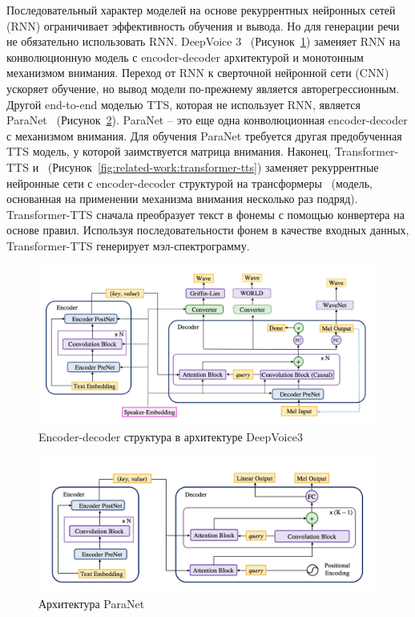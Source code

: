 Последовательный характер моделей на основе рекуррентных нейронных сетей (RNN) ограничивает эффективность обучения и вывода. Но для генерации речи не обязательно использовать RNN. DeepVoice 3~\cite{deepvoice3} (Рисунок~\ref{fig:related-work:deepvoice-3}) заменяет RNN на конволюционную модель с encoder-decoder архитектурой и монотонным механизмом внимания. Переход от RNN к сверточной нейронной сети (CNN) ускоряет обучение, но вывод модели по-прежнему является авторегрессионным. Другой end-to-end моделью TTS, которая не использует RNN, является ParaNet~\cite{paranet} (Рисунок~\ref{fig:related-work:paranet}). ParaNet -- это еще одна конволюционная encoder-decoder с механизмом внимания. Для обучения ParaNet требуется другая предобученная TTS модель, у которой заимствуется матрица внимания. Наконец, Transformer-TTS и~\cite{transformer-tts} (Рисунок~\ref{fig:related-work:transformer-tts}) заменяет рекуррентные нейронные сети с encoder-decoder структурой на трансформеры~\cite{attention-is-all} (модель, основанная на применении механизма внимания несколько раз подряд). Transformer-TTS сначала преобразует текст в фонемы с помощью конвертера на основе правил. Используя последовательности фонем в качестве входных данных, Transformer-TTS генерирует мэл-спектрограмму.

\begin{figure}[!ht]
\centering
\includegraphics[width=1.0\textwidth]{images/related-work/deepvoice-3.png}
\caption{Encoder-decoder структура в архитектуре DeepVoice3}
\label{fig:related-work:deepvoice-3}
\end{figure}

\begin{figure}[!ht]
\centering
\includegraphics[width=1.0\textwidth]{images/related-work/paranet.png}
\caption{Архитектура ParaNet~\cite{paranet}}
\label{fig:related-work:paranet}
\end{figure}

